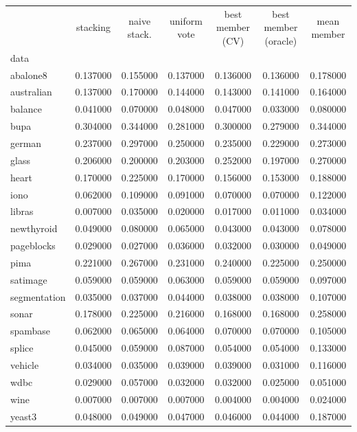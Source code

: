 \begin{tabular}{lcccccc}
\toprule
 & stacking & naive stack. & uniform vote & best member (CV) & best member (oracle) & mean member \\
data &  &  &  &  &  &  \\
\midrule
abalone8 & 0.137000 & 0.155000 & 0.137000 & 0.136000 & 0.136000 & 0.178000 \\
australian & 0.137000 & 0.170000 & 0.144000 & 0.143000 & 0.141000 & 0.164000 \\
balance & 0.041000 & 0.070000 & 0.048000 & 0.047000 & 0.033000 & 0.080000 \\
bupa & 0.304000 & 0.344000 & 0.281000 & 0.300000 & 0.279000 & 0.344000 \\
german & 0.237000 & 0.297000 & 0.250000 & 0.235000 & 0.229000 & 0.273000 \\
glass & 0.206000 & 0.200000 & 0.203000 & 0.252000 & 0.197000 & 0.270000 \\
heart & 0.170000 & 0.225000 & 0.170000 & 0.156000 & 0.153000 & 0.188000 \\
iono & 0.062000 & 0.109000 & 0.091000 & 0.070000 & 0.070000 & 0.122000 \\
libras & 0.007000 & 0.035000 & 0.020000 & 0.017000 & 0.011000 & 0.034000 \\
newthyroid & 0.049000 & 0.080000 & 0.065000 & 0.043000 & 0.043000 & 0.078000 \\
pageblocks & 0.029000 & 0.027000 & 0.036000 & 0.032000 & 0.030000 & 0.049000 \\
pima & 0.221000 & 0.267000 & 0.231000 & 0.240000 & 0.225000 & 0.250000 \\
satimage & 0.059000 & 0.059000 & 0.063000 & 0.059000 & 0.059000 & 0.097000 \\
segmentation & 0.035000 & 0.037000 & 0.044000 & 0.038000 & 0.038000 & 0.107000 \\
sonar & 0.178000 & 0.225000 & 0.216000 & 0.168000 & 0.168000 & 0.258000 \\
spambase & 0.062000 & 0.065000 & 0.064000 & 0.070000 & 0.070000 & 0.105000 \\
splice & 0.045000 & 0.059000 & 0.087000 & 0.054000 & 0.054000 & 0.133000 \\
vehicle & 0.034000 & 0.035000 & 0.039000 & 0.039000 & 0.031000 & 0.116000 \\
wdbc & 0.029000 & 0.057000 & 0.032000 & 0.032000 & 0.025000 & 0.051000 \\
wine & 0.007000 & 0.007000 & 0.007000 & 0.004000 & 0.004000 & 0.024000 \\
yeast3 & 0.048000 & 0.049000 & 0.047000 & 0.046000 & 0.044000 & 0.187000 \\
\bottomrule
\end{tabular}
